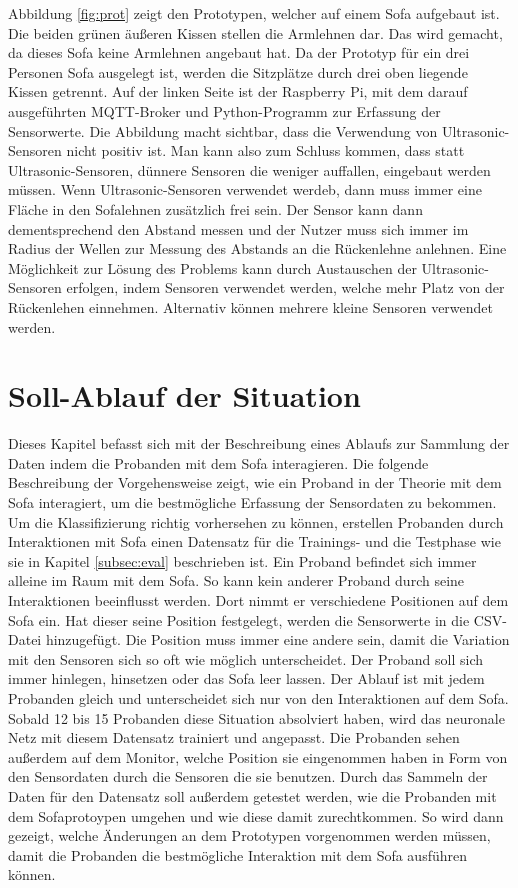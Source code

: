 Abbildung \ref{fig:prot} zeigt den Prototypen, welcher auf einem Sofa aufgebaut ist. Die beiden grünen äußeren Kissen stellen die Armlehnen dar. Das wird gemacht, da dieses Sofa keine Armlehnen angebaut hat. Da der Prototyp für ein drei Personen Sofa ausgelegt ist, werden die Sitzplätze durch drei oben liegende Kissen getrennt. Auf der linken Seite ist der Raspberry Pi, mit dem darauf ausgeführten MQTT-Broker und Python-Programm zur Erfassung der Sensorwerte. Die Abbildung macht sichtbar, dass die Verwendung von Ultrasonic-Sensoren nicht positiv ist. Man kann also zum Schluss kommen, dass statt Ultrasonic-Sensoren, dünnere Sensoren die weniger auffallen, eingebaut werden müssen. Wenn Ultrasonic-Sensoren verwendet werdeb, dann muss immer eine Fläche in den Sofalehnen zusätzlich frei sein. Der Sensor kann dann dementsprechend den Abstand messen und der Nutzer muss sich immer im Radius der Wellen zur Messung des Abstands an die Rückenlehne anlehnen. Eine Möglichkeit zur Lösung des Problems kann durch Austauschen der Ultrasonic-Sensoren erfolgen, indem Sensoren verwendet werden, welche mehr Platz von der Rückenlehen einnehmen. Alternativ können mehrere kleine Sensoren verwendet werden.

\section{Soll-Ablauf der Situation}
\label{sec:abl}
Dieses Kapitel befasst sich mit der Beschreibung eines Ablaufs zur Sammlung der Daten indem die Probanden mit dem Sofa interagieren. Die folgende Beschreibung der Vorgehensweise zeigt, wie ein Proband in der Theorie mit dem Sofa interagiert, um die bestmögliche Erfassung der Sensordaten zu bekommen.
\newline
\newline
Um die Klassifizierung richtig vorhersehen zu können, erstellen Probanden durch Interaktionen mit Sofa einen Datensatz für die Trainings- und die Testphase wie sie in Kapitel \ref{subsec:eval} beschrieben ist. Ein Proband befindet sich immer alleine im Raum mit dem Sofa. So kann kein anderer Proband durch seine Interaktionen beeinflusst werden. Dort nimmt er verschiedene Positionen auf dem Sofa ein. Hat dieser seine Position festgelegt, werden die Sensorwerte in die CSV-Datei hinzugefügt. Die Position muss immer eine andere sein, damit die Variation mit den Sensoren sich so oft wie möglich unterscheidet. Der Proband soll sich immer hinlegen, hinsetzen oder das Sofa leer lassen. Der Ablauf ist mit jedem Probanden gleich und unterscheidet sich nur von den Interaktionen auf dem Sofa. Sobald 12 bis 15 Probanden diese Situation absolviert haben, wird das neuronale Netz mit diesem Datensatz trainiert und angepasst.
Die Probanden sehen außerdem auf dem Monitor, welche Position sie eingenommen haben in Form von den Sensordaten durch die Sensoren die sie benutzen.
\newline
Durch das Sammeln der Daten für den Datensatz soll außerdem getestet werden, wie die Probanden mit dem Sofaprotoypen umgehen und wie diese damit zurechtkommen. So wird dann gezeigt, welche Änderungen an dem Prototypen vorgenommen werden müssen, damit die Probanden die bestmögliche Interaktion mit dem Sofa ausführen können.

